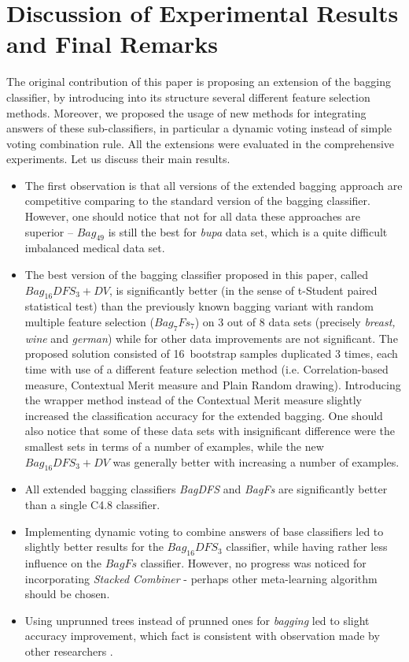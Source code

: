 \documentclass[runningheads]{llncs}
\begin{document}
\section{Discussion of Experimental Results and Final Remarks}

The original contribution of this paper is proposing an extension of the
bagging classifier, by introducing into its structure several different
feature selection methods. Moreover, we proposed the usage of new methods
for integrating answers of these sub-classifiers, in particular a dynamic
voting instead of simple voting combination rule. All the extensions were
evaluated in the comprehensive experiments. Let us discuss their main
results.
\begin{itemize}
  \item  The first
observation is that all versions of the extended bagging approach are
competitive comparing to the standard version of the bagging classifier.
However, one should notice that not for all data these approaches are
superior -- $Bag_{49}$ is still the best for {\em bupa} data set, which is a
quite difficult imbalanced medical data set.
  \item The best version of the bagging classifier proposed in this paper,
called $Bag_{16}DFS_3+DV$,  is significantly better (in the sense of
t-Student paired statistical test) than the previously known bagging variant
with random multiple feature selection ($Bag_7Fs_7$) on 3 out of 8 data sets
(precisely {\em breast, wine} and {\em german}) while for other data
improvements are not significant. The proposed solution consisted of
16~bootstrap samples duplicated 3 times, each time with use of a different
feature selection method (i.e. Correlation-based measure, Contextual Merit
measure and Plain Random drawing). Introducing the wrapper method instead of
the Contextual Merit measure slightly increased the classification accuracy
for the extended bagging. One should also notice that some of these data
sets with insignificant difference were the smallest sets in terms of a
number of examples, while the new $Bag_{16}DFS_3+DV$ was generally better
with increasing a number of examples.
  \item All extended bagging classifiers {\em BagDFS} and {\em BagFs} are
significantly better than a single C4.8 classifier.
  \item Implementing dynamic voting to combine answers of base classifiers
 led to slightly better results for the $Bag_{16}DFS_3$ classifier,
 while having rather less influence on the $BagFs$ classifier.
 However, no progress was noticed for incorporating {\em Stacked
 Combiner} - perhaps other meta-learning algorithm should be chosen.
\item
Using unprunned trees instead of prunned ones for {\em bagging} led to
slight accuracy improvement, which fact is consistent with observation made
by other researchers \cite{Bre}.

\end{itemize}
\end{document}
